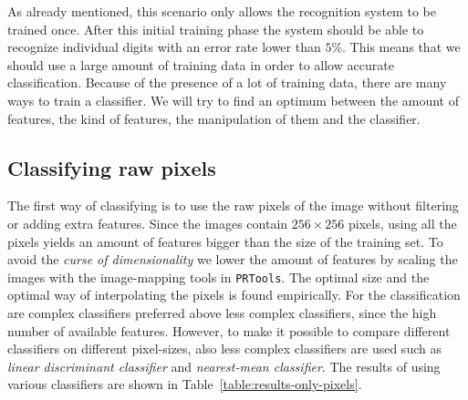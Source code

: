 \documentclass{article}
\begin{document}
As already mentioned, this scenario only allows the recognition system to be trained once. After this initial training phase the system should be able to recognize individual digits with an error rate lower than $5\%$. This means that we should use a large amount of training data in order to allow accurate classification. Because of the presence of a lot of training data, there are many ways to train a classifier. We will try to find an optimum between the amount of features, the kind of features, the manipulation of them and the classifier. 

\subsection{Classifying raw pixels}
The first way of classifying is to use the raw pixels of the image without filtering or adding extra features. Since the images contain $256 \times 256$ pixels, using all the pixels yields an amount of features bigger than the size of the training set. To avoid the \emph{curse of dimensionality} we lower the amount of features by scaling the images with the image-mapping tools in \texttt{PRTools}. The optimal size and the optimal way of interpolating the pixels is found empirically. For the classification are complex classifiers preferred above less complex classifiers, since the high number of available features. However, to make it possible to compare different classifiers on different pixel-sizes, also less complex classifiers are used such as \textit{linear discriminant classifier} and \textit{nearest-mean classifier}. The results of using various classifiers are shown in Table~\ref{table:results-only-pixels}.
\end{document}
